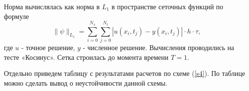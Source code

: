 \documentclass[12pt, a4paper]{article}
\begin{document}
\begin{table}[ht!]
	\caption{Нормы ошибки разностных схем, $\gamma = 0.5$}
	\centering
	\label{tab1}
\end{table}
Норма вычислялась как норма в $L_1$ в пространстве сеточных функций по формуле 
\begin{equation*}
	\|\psi\|_{L_1} = \sum_{i=0}^{N_x} \sum_{j=0}^{N_t} \left| u(x_i, t_j) - y(x_i, t_j) \right| \cdot h \cdot \tau,
\end{equation*}
  где $u$ - точное решение, $y$ - численное решение. Вычисления проводились на тесте «Косинус». Сетка строилась до момента времени $T = 1$.

\clearpage
Отдельно приведем таблицу с результатами расчетов по схеме (\ref{s4}). По таблице можно сделать вывод о неустойчивости данной схемы.
\begin{table}[ht!]
	\caption{Норма ошибки разностной схемы (\ref{s4}) при различных параметрах}
	\centering
	\label{tab2}
\end{table}
\end{document}
